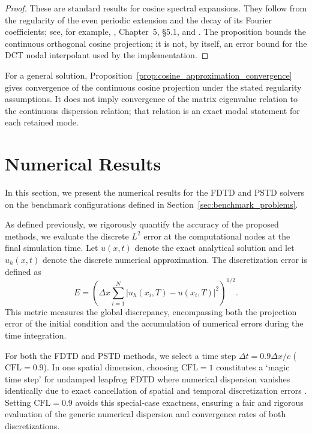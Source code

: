\documentclass{Configuration_Files/PoliMi3i_thesis}
\newif\ifshowthesischanges
\DeclareRobustCommand{\thesischange}[2]{%
    \ifshowthesischanges
        \textcolor{#1}{#2}%
    \else
        #2%
    \fi
}
\def\thesischange#1#2{#2}%
\begin{document}
\begin{proof}
These are standard results for cosine spectral expansions. They follow from
the regularity of the even periodic extension and the decay of its Fourier
coefficients; see, for example, \cite{canuto_spectral_2006}, Chapter~5,
\S5.1, and \cite{quarteroni_numerical_2007}. The proposition bounds the
continuous orthogonal cosine projection; it is not, by itself, an error bound
for the DCT nodal interpolant used by the implementation.
\end{proof}

For a general solution, Proposition~\ref{prop:cosine_approximation_convergence}
gives convergence of the continuous cosine projection under the stated
regularity assumptions. It does not imply convergence of the matrix
eigenvalue relation to the continuous dispersion relation; that relation is
an exact modal statement for each retained mode.

\section{Numerical Results}
\label{sec:numerical_results}
In this section, we present the numerical results for the FDTD and PSTD solvers on the benchmark configurations defined in Section~\ref{sec:benchmark_problems}.

As defined previously, we rigorously quantify the accuracy of the proposed methods, we evaluate the discrete $L^2$ error at the computational nodes at the final simulation time. Let $u(x,t)$ denote the exact analytical solution and let $u_h(x,t)$ denote the discrete numerical approximation. The discretization error is defined as
\[
E
=
\left(
\Delta x
\sum_{i=1}^N
|u_h(x_i,T)-u(x_i,T)|^2
\right)^{1/2}.
\]
This metric measures the global discrepancy, encompassing both the projection error of the initial condition and the accumulation of numerical errors during the time integration.

\thesischange{blue}{For both the FDTD and PSTD methods, we select a time step $\Delta t = 0.9\Delta x/c$ ($\mathrm{CFL} = 0.9$). In one spatial dimension, choosing $\mathrm{CFL} = 1$ constitutes a `magic time step' for undamped leapfrog FDTD where numerical dispersion vanishes identically due to exact cancellation of spatial and temporal discretization errors \citep{bilbao_numerical_2009}. Setting $\mathrm{CFL} = 0.9$ avoids this special-case exactness, ensuring a fair and rigorous evaluation of the generic numerical dispersion and convergence rates of both discretizations.}
\end{document}
